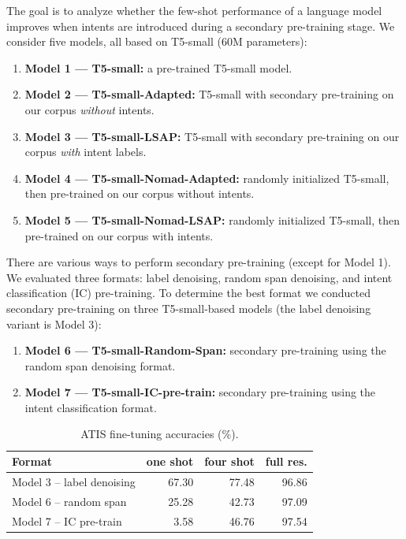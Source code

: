\documentclass[11pt]{article}
\begin{document}
The goal is to analyze whether the few-shot performance of a language model
improves when intents are introduced during a secondary pre-training stage.
We consider five models, all based on T5-small (60M parameters):

\begin{enumerate}
  \item \textbf{Model 1 --- T5-small:} a pre-trained T5-small model.
  \item \textbf{Model 2 --- T5-small-Adapted:} T5-small with secondary
        pre-training on our corpus \emph{without} intents.
  \item \textbf{Model 3 --- T5-small-LSAP:} T5-small with secondary
        pre-training on our corpus \emph{with} intent labels.
  \item \textbf{Model 4 --- T5-small-Nomad-Adapted:} randomly initialized
        T5-small, then pre-trained on our corpus without intents.
  \item \textbf{Model 5 --- T5-small-Nomad-LSAP:} randomly initialized
        T5-small, then pre-trained on our corpus with intents.
\end{enumerate}

There are various ways to perform secondary pre-training (except for Model
1). We evaluated three formats: label denoising, random span denoising, and
intent classification (IC) pre-training. To determine the best format we
conducted secondary pre-training on three T5-small-based models (the label
denoising variant is Model 3):

\begin{enumerate}
  \item \textbf{Model 6 --- T5-small-Random-Span:} secondary pre-training
        using the random span denoising format.
  \item \textbf{Model 7 --- T5-small-IC-pre-train:} secondary pre-training
        using the intent classification format.
\end{enumerate}

\begin{table}[t]
\centering
\small
\begin{tabular}{lrrr}
\toprule
Format & one shot & four shot & full res. \\
\midrule
Model 3 -- label denoising & 67.30 & 77.48 & 96.86 \\
Model 6 -- random span      & 25.28 & 42.73 & 97.09 \\
Model 7 -- IC pre-train      & 3.58 & 46.76 & 97.54 \\
\bottomrule
\end{tabular}
\caption{ATIS fine-tuning accuracies (\%).}
\label{tab:atis-format}
\end{table}
\end{document}

